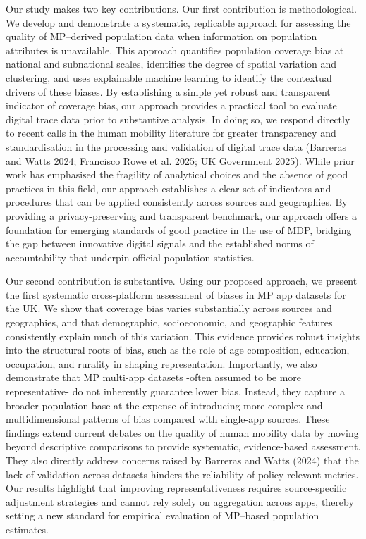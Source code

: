 \documentclass{article}
\begin{document}
Our study makes two key contributions. Our first contribution is
methodological. We develop and demonstrate a systematic, replicable
approach for assessing the quality of MP--derived population data when
information on population attributes is unavailable. This approach
quantifies population coverage bias at national and subnational scales,
identifies the degree of spatial variation and clustering, and uses
explainable machine learning to identify the contextual drivers of these
biases. By establishing a simple yet robust and transparent indicator of
coverage bias, our approach provides a practical tool to evaluate
digital trace data prior to substantive analysis. In doing so, we
respond directly to recent calls in the human mobility literature for
greater transparency and standardisation in the processing and
validation of digital trace data (Barreras and Watts 2024; Francisco Rowe et al. 2025; UK Government 2025). While prior work has
emphasised the fragility of analytical choices and the absence of good
practices in this field, our approach establishes a clear set of
indicators and procedures that can be applied consistently across
sources and geographies. By providing a privacy-preserving and
transparent benchmark, our approach offers a foundation for emerging
standards of good practice in the use of MDP, bridging the gap between
innovative digital signals and the established norms of accountability
that underpin official population statistics.

Our second contribution is substantive. Using our proposed approach, we
present the first systematic cross-platform assessment of biases in MP
app datasets for the UK. We show that coverage bias varies substantially
across sources and geographies, and that demographic, socioeconomic, and
geographic features consistently explain much of this variation. This
evidence provides robust insights into the structural roots of bias,
such as the role of age composition, education, occupation, and rurality
in shaping representation. Importantly, we also demonstrate that MP
multi-app datasets -often assumed to be more representative- do not
inherently guarantee lower bias. Instead, they capture a broader
population base at the expense of introducing more complex and
multidimensional patterns of bias compared with single-app sources.
These findings extend current debates on the quality of human mobility
data by moving beyond descriptive comparisons to provide systematic,
evidence-based assessment. They also directly address concerns raised by
Barreras and Watts (2024) that the lack of validation across datasets
hinders the reliability of policy-relevant metrics. Our results
highlight that improving representativeness requires source-specific
adjustment strategies and cannot rely solely on aggregation across apps,
thereby setting a new standard for empirical evaluation of MP--based
population estimates.
\end{document}
